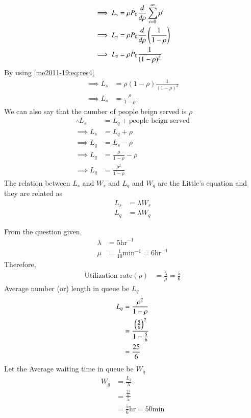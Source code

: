 \begin{itemize}
\begin{align}
    \implies L_s&=\rho P_0\frac{d}{d\rho}\sum_{i=0}^{\infty}\rho^i\\
    \implies L_s&=\rho P_0\frac{d}{d\rho}\left(\frac{1}{1-\rho}\right)\\
    \implies L_s&=\rho P_0\frac{1}{(1-\rho)^2}
\end{align}
By using \eqref{me2011-19:eq:res4}
\begin{align}
    \implies L_s&=\rho(1-\rho)\frac{1}{(1-\rho)^2}\\
    \implies L_s&=\frac{\rho}{1-\rho}
\end{align}
We can also say that the number of people beign served is $\rho$
\begin{align}
    \therefore L_s&=L_q+\text{people beign served}\\
    \implies L_s&=L_q+\rho\\
    \implies L_q&=L_s-\rho\\
    \implies L_q&=\frac{\rho}{1-\rho}-\rho\\
    \implies L_q&=\frac{\rho^2}{1-\rho}
\end{align}
\newpage
The relation between $L_s$ and $W_s$ and $L_q$ and $W_q$ are the Little's equation and they are related as
\begin{align}
    L_s&=\lambda W_s\\
    L_q&=\lambda W_q
\end{align}
\end{itemize}
%
From the question given,
\begin{align}
    \lambda &=5\text{hr}^{-1}\\
    \mu&=\frac{1}{10}\text{min}^{-1} =6\text{hr}^{-1}
    \end{align}
Therefore,
\begin{align}
    \text{Utilization rate}(\rho)&=\frac{\lambda}{\mu}=\frac{5}{6}
    \end{align}
Average number (or) length in queue be $L_q$
    \begin{align}
    L_q&=\frac{\rho^2}{1-\rho}\\
    &=\frac{\left(\frac{5}{6}\right)^2}{1-\frac{5}{6}}\\
    &=\frac{25}{6}
    \end{align}
Let the Average waiting time in queue be $W_q$
    \begin{align}
    W_q&=\frac{L_q}{\lambda}\\
    &=\frac{\frac{25}{6}}{5}\\
    &=\frac{5}{6}\text{hr}=50\text{min}
\end{align}
